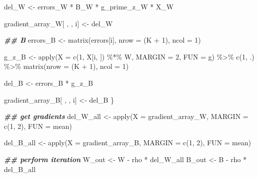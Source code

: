 \documentclass[
]{book}
\newenvironment{Shaded}{\begin{snugshade}}{\end{snugshade}}
\newcommand{\AttributeTok}[1]{\textcolor[rgb]{0.77,0.63,0.00}{#1}}
\newcommand{\DecValTok}[1]{\textcolor[rgb]{0.00,0.00,0.81}{#1}}
\newcommand{\DocumentationTok}[1]{\textcolor[rgb]{0.56,0.35,0.01}{\textbf{\textit{#1}}}}
\newcommand{\FunctionTok}[1]{\textcolor[rgb]{0.00,0.00,0.00}{#1}}
\newcommand{\NormalTok}[1]{#1}
\newcommand{\OtherTok}[1]{\textcolor[rgb]{0.56,0.35,0.01}{#1}}
\newcommand{\SpecialCharTok}[1]{\textcolor[rgb]{0.00,0.00,0.00}{#1}}
\begin{document}
\begin{Shaded}
\begin{Highlighting}[]
\NormalTok{    del\_W }\OtherTok{\textless{}{-}}\NormalTok{ errors\_W }\SpecialCharTok{*}\NormalTok{ B\_W }\SpecialCharTok{*}\NormalTok{ g\_prime\_z\_W }\SpecialCharTok{*}\NormalTok{ X\_W}
    
\NormalTok{    gradient\_array\_W[ , , i] }\OtherTok{\textless{}{-}}\NormalTok{ del\_W}
    
    \DocumentationTok{\#\# B}
\NormalTok{    errors\_B }\OtherTok{\textless{}{-}} \FunctionTok{matrix}\NormalTok{(errors[i],}
                       \AttributeTok{nrow =}\NormalTok{ (K }\SpecialCharTok{+} \DecValTok{1}\NormalTok{),}
                       \AttributeTok{ncol =} \DecValTok{1}\NormalTok{)}
    
\NormalTok{    g\_z\_B }\OtherTok{\textless{}{-}} \FunctionTok{apply}\NormalTok{(}\AttributeTok{X =} \FunctionTok{c}\NormalTok{(}\DecValTok{1}\NormalTok{, X[i, ]) }\SpecialCharTok{\%*\%}\NormalTok{ W,}
                   \AttributeTok{MARGIN =} \DecValTok{2}\NormalTok{,}
                   \AttributeTok{FUN =}\NormalTok{ g) }\SpecialCharTok{\%\textgreater{}\%}
      \FunctionTok{c}\NormalTok{(}\DecValTok{1}\NormalTok{, .) }\SpecialCharTok{\%\textgreater{}\%}
      \FunctionTok{matrix}\NormalTok{(}\AttributeTok{nrow =}\NormalTok{ (K }\SpecialCharTok{+} \DecValTok{1}\NormalTok{),}
             \AttributeTok{ncol =} \DecValTok{1}\NormalTok{)}
    
\NormalTok{    del\_B }\OtherTok{\textless{}{-}}\NormalTok{ errors\_B }\SpecialCharTok{*}\NormalTok{ g\_z\_B}
    
\NormalTok{    gradient\_array\_B[ , , i] }\OtherTok{\textless{}{-}}\NormalTok{ del\_B}
\NormalTok{  \}}
  
  \DocumentationTok{\#\# get gradients}
\NormalTok{  del\_W\_all }\OtherTok{\textless{}{-}} \FunctionTok{apply}\NormalTok{(}\AttributeTok{X =}\NormalTok{ gradient\_array\_W,}
                     \AttributeTok{MARGIN =} \FunctionTok{c}\NormalTok{(}\DecValTok{1}\NormalTok{, }\DecValTok{2}\NormalTok{),}
                     \AttributeTok{FUN =}\NormalTok{ mean)}
  
\NormalTok{  del\_B\_all }\OtherTok{\textless{}{-}} \FunctionTok{apply}\NormalTok{(}\AttributeTok{X =}\NormalTok{ gradient\_array\_B,}
                   \AttributeTok{MARGIN =} \FunctionTok{c}\NormalTok{(}\DecValTok{1}\NormalTok{, }\DecValTok{2}\NormalTok{),}
                   \AttributeTok{FUN =}\NormalTok{ mean)}
  
  \DocumentationTok{\#\# perform iteration}
\NormalTok{  W\_out }\OtherTok{\textless{}{-}}\NormalTok{ W }\SpecialCharTok{{-}}\NormalTok{ rho }\SpecialCharTok{*}\NormalTok{ del\_W\_all}
\NormalTok{  B\_out }\OtherTok{\textless{}{-}}\NormalTok{ B }\SpecialCharTok{{-}}\NormalTok{ rho }\SpecialCharTok{*}\NormalTok{ del\_B\_all}
  

\end{Highlighting}
\end{Shaded}
\end{document}
